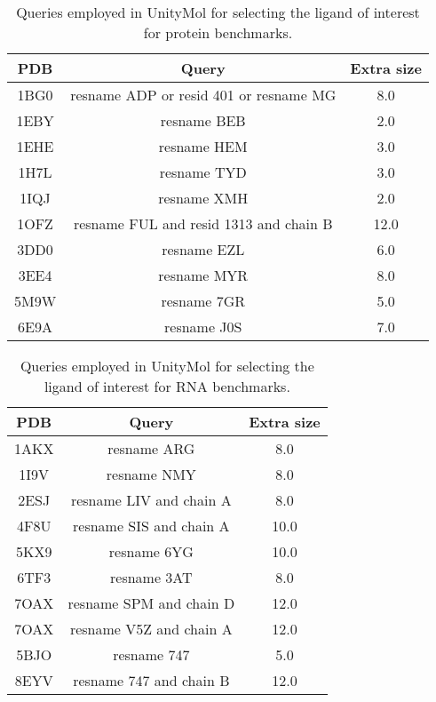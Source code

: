 \begin{table}[H]
  \caption{\label{tab:appx1/selection_prot} Queries employed in UnityMol for selecting the ligand of interest for protein benchmarks.}
  \centering
  \begin{tabular}{ccc}
    \hline
    PDB  & Query                                  & Extra size \\ \hline
    1BG0 & resname ADP or resid 401 or resname MG & 8.0        \\
    1EBY & resname BEB                            & 2.0        \\
    1EHE & resname HEM                            & 3.0        \\
    1H7L & resname TYD                            & 3.0        \\
    1IQJ & resname XMH                            & 2.0        \\
    1OFZ & resname FUL and resid 1313 and chain B & 12.0       \\
    3DD0 & resname EZL                            & 6.0        \\
    3EE4 & resname MYR                            & 8.0        \\
    5M9W & resname 7GR                            & 5.0        \\
    6E9A & resname J0S                            & 7.0        \\ \hline
  \end{tabular}
\end{table}

\begin{table}[H]
  \caption{\label{tab:appx1/selection_rna} Queries employed in UnityMol for selecting the ligand of interest for RNA benchmarks.}
  \centering
  \begin{tabular}{ccc}
    \hline
    PDB  & Query                   & Extra size  \\ \hline
    1AKX & resname ARG             & 8.0         \\
    1I9V & resname NMY             & 8.0         \\
    2ESJ & resname LIV and chain A & 8.0         \\
    4F8U & resname SIS and chain A & 10.0        \\
    5KX9 & resname 6YG             & 10.0        \\
    6TF3 & resname 3AT             & 8.0         \\
    7OAX & resname SPM and chain D & 12.0        \\
    7OAX & resname V5Z and chain A & 12.0        \\
    5BJO & resname 747             & 5.0         \\
    8EYV & resname 747 and chain B & 12.0        \\ \hline
  \end{tabular}
\end{table}

